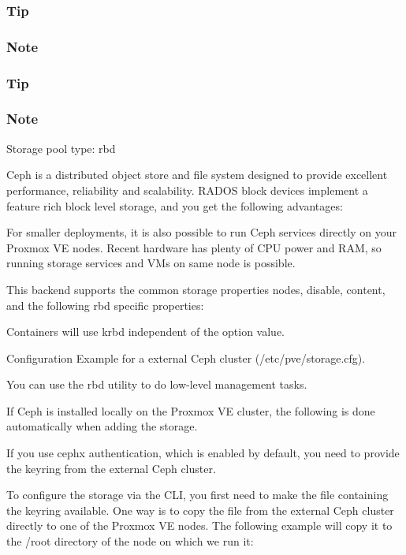 \subsubsection{Tip}

\subsubsection{Note}

\subsubsection{Tip}

\subsubsection{Note}

Storage pool type: rbd

Ceph is a distributed object store and file system designed to provide excellent performance, reliability and scalability. RADOS block devices implement a feature rich block level storage, and you get the following advantages:

For smaller deployments, it is also possible to run Ceph services directly on your Proxmox VE nodes. Recent hardware has plenty of CPU power and RAM, so running storage services and VMs on same node is possible.

This backend supports the common storage properties nodes, disable, content, and the following rbd specific properties:

Containers will use krbd independent of the option value.

Configuration Example for a external Ceph cluster (/etc/pve/storage.cfg).

You can use the rbd utility to do low-level management tasks.

If Ceph is installed locally on the Proxmox VE cluster, the following is done automatically when adding the storage.

If you use cephx authentication, which is enabled by default, you need to provide the keyring from the external Ceph cluster.

To configure the storage via the CLI, you first need to make the file containing the keyring available. One way is to copy the file from the external Ceph cluster directly to one of the Proxmox VE nodes. The following example will copy it to the /root directory of the node on which we run it:

